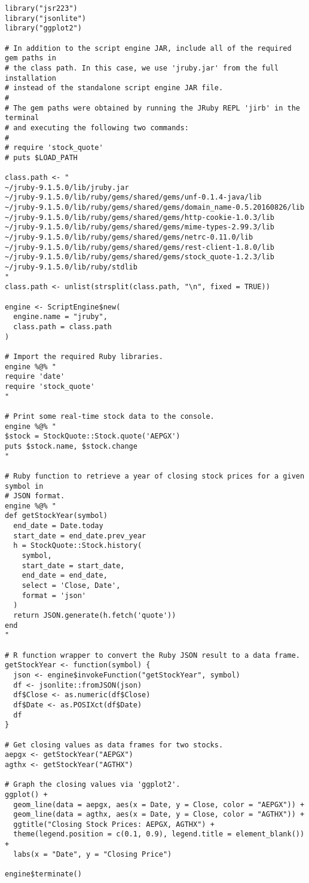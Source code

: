 \begin{verbatim}
library("jsr223")
library("jsonlite")
library("ggplot2")

# In addition to the script engine JAR, include all of the required gem paths in
# the class path. In this case, we use 'jruby.jar' from the full installation 
# instead of the standalone script engine JAR file.
# 
# The gem paths were obtained by running the JRuby REPL 'jirb' in the terminal
# and executing the following two commands:
# 
# require 'stock_quote'
# puts $LOAD_PATH

class.path <- "
~/jruby-9.1.5.0/lib/jruby.jar
~/jruby-9.1.5.0/lib/ruby/gems/shared/gems/unf-0.1.4-java/lib
~/jruby-9.1.5.0/lib/ruby/gems/shared/gems/domain_name-0.5.20160826/lib
~/jruby-9.1.5.0/lib/ruby/gems/shared/gems/http-cookie-1.0.3/lib
~/jruby-9.1.5.0/lib/ruby/gems/shared/gems/mime-types-2.99.3/lib
~/jruby-9.1.5.0/lib/ruby/gems/shared/gems/netrc-0.11.0/lib
~/jruby-9.1.5.0/lib/ruby/gems/shared/gems/rest-client-1.8.0/lib
~/jruby-9.1.5.0/lib/ruby/gems/shared/gems/stock_quote-1.2.3/lib
~/jruby-9.1.5.0/lib/ruby/stdlib
"
class.path <- unlist(strsplit(class.path, "\n", fixed = TRUE))

engine <- ScriptEngine$new(
  engine.name = "jruby",
  class.path = class.path
)

# Import the required Ruby libraries.
engine %@% "
require 'date'
require 'stock_quote'
"

# Print some real-time stock data to the console.
engine %@% "
$stock = StockQuote::Stock.quote('AEPGX')
puts $stock.name, $stock.change
"

# Ruby function to retrieve a year of closing stock prices for a given symbol in
# JSON format.
engine %@% "
def getStockYear(symbol)
  end_date = Date.today
  start_date = end_date.prev_year
  h = StockQuote::Stock.history(
    symbol,
    start_date = start_date,
    end_date = end_date,
    select = 'Close, Date',
    format = 'json'
  )
  return JSON.generate(h.fetch('quote'))
end
"

# R function wrapper to convert the Ruby JSON result to a data frame.
getStockYear <- function(symbol) {
  json <- engine$invokeFunction("getStockYear", symbol)
  df <- jsonlite::fromJSON(json)
  df$Close <- as.numeric(df$Close)
  df$Date <- as.POSIXct(df$Date)
  df
}

# Get closing values as data frames for two stocks.
aepgx <- getStockYear("AEPGX")
agthx <- getStockYear("AGTHX")

# Graph the closing values via 'ggplot2'.
ggplot() +
  geom_line(data = aepgx, aes(x = Date, y = Close, color = "AEPGX")) +
  geom_line(data = agthx, aes(x = Date, y = Close, color = "AGTHX")) +
  ggtitle("Closing Stock Prices: AEPGX, AGTHX") +
  theme(legend.position = c(0.1, 0.9), legend.title = element_blank()) +
  labs(x = "Date", y = "Closing Price")

engine$terminate()
\end{verbatim}


